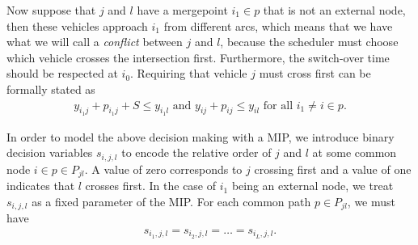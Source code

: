 \documentclass{article}
\theoremstyle{definition}
\begin{document}
Now suppose that $j$ and $l$ have a mergepoint $i_{1} \in p$ that is not an
external node, then these vehicles approach $i_{1}$ from different arcs,
which means that we have what we will call a \textit{conflict} between $j$ and
$l$, because the scheduler must choose which vehicle crosses the intersection
first. Furthermore, the switch-over time should be respected at $i_{0}$.
Requiring that vehicle $j$ must cross first can be formally stated as
\begin{align*}
  y_{i_{1}j} + p_{i_{1}j} + S \leq y_{i_{1}l} \text{ and } y_{ij} + p_{ij} \leq y_{il} \text{ for all } i_{1} \neq i \in p .
\end{align*}

In order to model the above decision making with a MIP, we introduce binary
decision variables $s_{i,j,l}$ to encode the relative order of $j$ and $l$ at some common
node $i \in p \in P_{jl}$. A value of zero corresponds to $j$ crossing first and
a value of one indicates that $l$ crosses first.
In the case of $i_{1}$ being an external node, we treat $s_{i,j,l}$ as a fixed
parameter of the MIP.
For each common path $p \in P_{jl}$, we must have
\begin{align*}
s_{i_{1},j,l} = s_{i_{2},j,l} = \dots = s_{i_{L},j,l}.
\end{align*}
\end{document}
